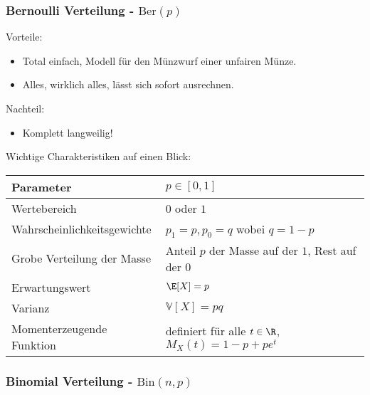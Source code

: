 \subsubsection*{Bernoulli Verteilung - $\text{Ber}(p)$}

{Vorteile:} 
\begin{itemize}
	\item Total einfach, Modell f\"ur den M\"unzwurf einer unfairen M\"unze.
	\item Alles, wirklich alles, l\"asst sich sofort ausrechnen.
\end{itemize}

{Nachteil:}
\begin{itemize}
	\item Komplett langweilig!
\end{itemize}

Wichtige Charakteristiken auf einen Blick:
\begin{center}
\begin{tabular}[h]{|l|l|}
\hline
Parameter& $p\in [0,1]$ \\
\hline
Wertebereich & $0$ oder $1$\\
\hline
Wahrscheinlichkeitsgewichte& $p_1=p, p_0=q$ wobei $q=1-p$\\
\hline
Grobe Verteilung der Masse & Anteil $p$ der Masse auf der $1$, Rest auf der $0$\\
\hline
Erwartungswert& $\E[X]=p$ \\
\hline
Varianz & $\mathbb V[X]=pq$\\
\hline
Momenterzeugende Funktion& definiert f\"ur alle $t\in \R$, $M_X(t)=1-p+pe^t$\\
\hline
\end{tabular}
\end{center}





\subsubsection*{Binomial Verteilung - $\text{Bin}(n,p)$}

